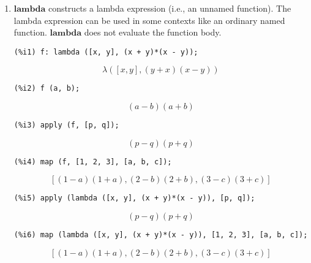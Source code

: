 \documentclass[12pt,leqno]{article}
\begin{document}
\begin{enumerate}
\item $\mathbf{lambda}$ constructs a lambda expression (i.e., an unnamed function).
The lambda expression can be used in some contexts like an ordinary named function.
$\mathbf{lambda}$ does not evaluate the function body.
\begin{verbatim}
(%i1) f: lambda ([x, y], (x + y)*(x - y));
\end{verbatim}
\begin{dmath}[number={\(\mathop{\mathrm{\%o}_{1}}\)}]
\lambda\left(\left[x, y\right], \left(y+x\right) \left(x-y\right)\right)
\end{dmath}
\begin{verbatim}
(%i2) f (a, b);
\end{verbatim}
\begin{dmath}[number={\(\mathop{\mathrm{\%o}_{2}}\)}]
\left(a-b\right) \left(a+b\right)
\end{dmath}
\begin{verbatim}
(%i3) apply (f, [p, q]);
\end{verbatim}
\begin{dmath}[number={\(\mathop{\mathrm{\%o}_{3}}\)}]
\left(p-q\right) \left(p+q\right)
\end{dmath}
\begin{verbatim}
(%i4) map (f, [1, 2, 3], [a, b, c]);
\end{verbatim}
\begin{dmath}[number={\(\mathop{\mathrm{\%o}_{4}}\)}]
\left[\left(1-a\right) \left(1+a\right), \left(2-b\right) \left(2+b\right), \left(3-c\right) \left(3+c\right)\right]
\end{dmath}
\begin{verbatim}
(%i5) apply (lambda ([x, y], (x + y)*(x - y)), [p, q]);
\end{verbatim}
\begin{dmath}[number={\(\mathop{\mathrm{\%o}_{5}}\)}]
\left(p-q\right) \left(p+q\right)
\end{dmath}
\begin{verbatim}
(%i6) map (lambda ([x, y], (x + y)*(x - y)), [1, 2, 3], [a, b, c]);
\end{verbatim}
\begin{dmath}[number={\(\mathop{\mathrm{\%o}_{6}}\)}]
\left[\left(1-a\right) \left(1+a\right), \left(2-b\right) \left(2+b\right), \left(3-c\right) \left(3+c\right)\right]
\end{dmath}


\end{enumerate}
\end{document}

